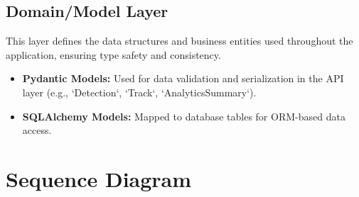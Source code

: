 \subsection{Domain/Model Layer}
\label{subsection:domain-model-layer}
This layer defines the data structures and business entities used throughout the application, ensuring type safety and consistency.
\begin{itemize}
    \item \textbf{Pydantic Models:} Used for data validation and serialization in the API layer (e.g., `Detection`, `Track`, `AnalyticsSummary`).
    \item \textbf{SQLAlchemy Models:} Mapped to database tables for ORM-based data access.
\end{itemize}






\section{Sequence Diagram}
\label{section:sequence-diagram}


